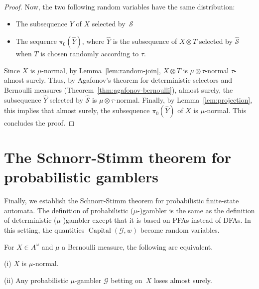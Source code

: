 \documentclass[11pt]{article}
\renewcommand{\S}{\mathcal{S}}
\newcommand{\G}{\mathcal{G}}
\DeclareMathOperator{\capital}{Capital}
\begin{document}
\begin{proof}
Now, the two following random variables have the same distribution: 
\begin{itemize}
\item The subsequence $Y$ of $X$ selected by~$\S$
\item The sequence $\pi_0(\hat{Y})$, where $\hat{Y}$ is the subsequence of $X \otimes T$ selected by $\hat{\S}$ when $T$ is chosen randomly according to $\tau$. 
\end{itemize}

Since $X$ is $\mu$-normal, by Lemma~\ref{lem:random-join}, $X \otimes T$ is $\mu \otimes \tau$-normal $\tau$-almost surely. Thus, by Agafonov's theorem for deterministic selectors and Bernoulli measures (Theorem~\ref{thm:agafonov-bernoulli}), almost surely, the subsequence $\hat{Y}$ selected by $\hat{\S}$ is $\mu \otimes \tau$-normal. Finally, by Lemma~\ref{lem:projection}, this implies that almost surely, the subsequence $\pi_0(\hat{Y})$ of $X$ is $\mu$-normal. This concludes the proof. 

\end{proof}

\section{The Schnorr-Stimm theorem for probabilistic gamblers}

Finally, we establish the Schnorr-Stimm theorem for probabilistic finite-state automata. The definition of probabilistic ($\mu$-)gambler is the same as the definition of deterministic ($\mu$-)gambler except that it is based on PFAs instead of DFAs. In this setting, the quantities $\capital(\G,w)$ become random variables. \\


\begin{theorem}
For $X \in A^\omega$ and $\mu$ a Bernoulli measure, the following are equivalent.
\item[(i)] $X$ is $\mu$-normal. 
\item[(ii)] Any probabilistic $\mu$-gambler $\G$ betting on~$X$ loses almost surely.   
\end{theorem}
\end{document}
